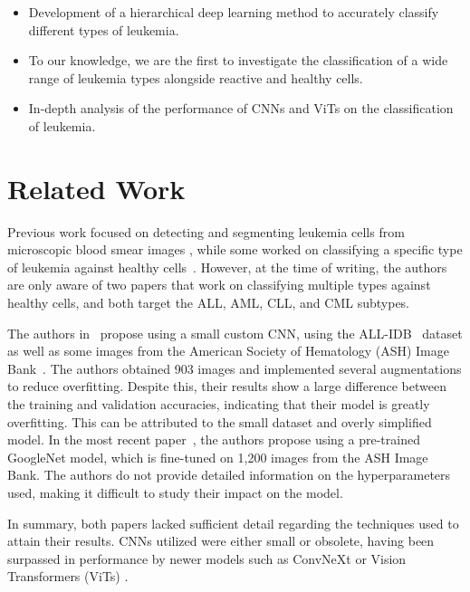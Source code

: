 \documentclass[runningheads]{llncs}
\begin{document}
\begin{itemize}
    \item Development of a hierarchical deep learning method to accurately classify different types of leukemia.    
    \item To our knowledge, we are the first to investigate the classification of a wide range of leukemia types alongside reactive and healthy cells.
    \item In-depth analysis of the performance of CNNs and ViTs on the classification of leukemia.
\end{itemize}


\section{Related Work}
Previous work focused on detecting and segmenting leukemia cells from microscopic blood smear images \cite{dhal2020acute,genovese2021acute,das2021transfer,mohapatra2012lymphocyte}, while some worked on classifying a specific type of leukemia against healthy cells~\cite{jothi2019rough, shah2019classification, negm2018decision, rawat2017computer}. However, at the time of writing, the authors are only aware of two papers that work on classifying multiple types against healthy cells, and both target the ALL, AML, CLL, and CML subtypes.

The authors in~\cite{ahmed2019identification} propose using a small custom CNN, using the ALL-IDB~\cite{6115881} dataset as well as some images from the American Society of Hematology (ASH) Image Bank~\cite{imagebank}. The authors obtained 903 images and implemented several augmentations to reduce overfitting. Despite this, their results show a large difference between the training and validation accuracies, indicating that their model is greatly overfitting. This can be attributed to the small dataset and overly simplified model. In the most recent paper~\cite{9425264}, the authors propose using a pre-trained GoogleNet model, which is fine-tuned on 1,200 images from the ASH Image Bank. The authors do not provide detailed information on the hyperparameters used, making it difficult to study their impact on the model.

In summary, both papers lacked sufficient detail regarding the techniques used to attain their results. %
CNNs utilized were either small or obsolete, having been surpassed in performance by newer models such as ConvNeXt \cite{liu2022convnet} or Vision Transformers (ViTs) \cite{dosovitskiy2020image}.
\end{document}
